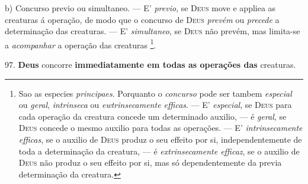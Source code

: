 b) Concurso previo ou simultaneo. --- E' \emph{previo}, se \textsc{Deus} move e appliea as creaturas á operação, de modo que o concurso de \textsc{Deus} \emph{prevém} ou \emph{precede} a determinação das creaturas. --- E' \emph{simultaneo}, se \textsc{Deus} não prevém, mas limita-se a \emph{acompanhar} a operação das creaturas \footnote{Sao as especies \emph{principaes}. Porquanto o \emph{concurso} pode ser tambem \emph{especial} ou \emph{geral}, \emph{intrinseca} ou \emph{ewtrinsecamente efficas}. --- E' \emph{especial}, se \textsc{Deus} para cada operação da creatura concede um determinado auxilio, --- é \emph{geral}, se \textsc{Deus} concede o mesmo auxilio para todas as operações. --- E' \emph{intrinsecamente efficas}, se o auxilio de \textsc{Deus} produz o seu effeito por si, independentemente de toda a determinação da creatura, --- é \emph{extrinsecamente efficaz}, se o auxilio de \textsc{Deus} não produz o seu effeito por si, mas só dependentemente da previa determinação da creatura.}.

 97. \textbf{Deus} concorre \textbf{immediatamente em todas as operações das} creaturas.

